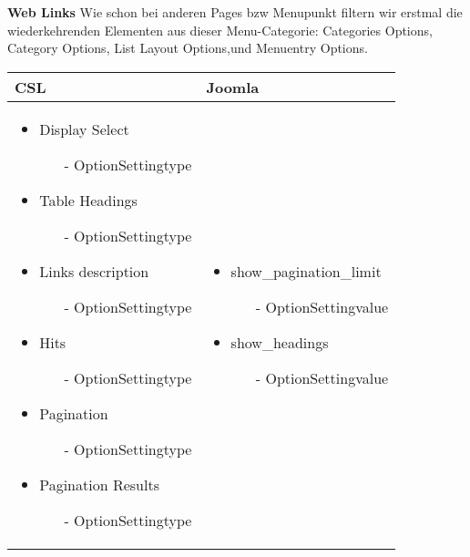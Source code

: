 \textbf{Web Links }
Wie schon bei anderen Pages bzw Menupunkt filtern wir erstmal  die wiederkehrenden Elementen aus dieser Menu-Categorie: Categories Options, Category Options, List Layout Options,und Menuentry Options.

\begin{minipage}{0.7\textwidth}
\begin{tabular}{|p{} | p{}|}
\hline
\textbf{CSL} & \textbf{Joomla} \\ 
\hline
\begin{itemize}
\item Display Select
 \begin{enumerate}
    \item[-] OptionSettingtype
  \end{enumerate} 
\item Table Headings
 \begin{enumerate}
    \item[-] OptionSettingtype
  \end{enumerate} 
\item Links description
 \begin{enumerate}
    \item[-] OptionSettingtype
  \end{enumerate} 
\item Hits
 \begin{enumerate}
    \item[-] OptionSettingtype
  \end{enumerate}  
\item Pagination
 \begin{enumerate}
    \item[-] OptionSettingtype
  \end{enumerate}  
\item Pagination Results
 \begin{enumerate}
    \item[-] OptionSettingtype
  \end{enumerate}  
\end{itemize} 
 & 
\begin{itemize}
\item show\_pagination\_limit
\begin{enumerate}
    \item[-] OptionSettingvalue
  \end{enumerate} 
\item show\_headings
\begin{enumerate}
    \item[-] OptionSettingvalue

\end{enumerate}
\end{itemize}
\end{tabular}
\end{minipage}

